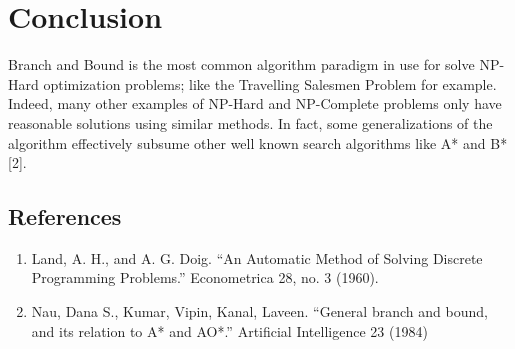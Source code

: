 \documentclass{article}
\newcommand{\be}{\begin{enumerate}}
\newcommand{\ee}{\end{enumerate}}
\begin{document}
\section*{Conclusion}
Branch and Bound is the most common algorithm paradigm in use for solve NP-Hard 
optimization problems; like the Travelling Salesmen Problem for example. Indeed, many 
other examples of NP-Hard and NP-Complete problems only have reasonable solutions using
similar methods. In fact, some generalizations of the algorithm effectively subsume 
other well known search algorithms like A* and B* [2].

\subsection*{References}
\be[1.]
    \item Land, A. H., and A. G. Doig. ``An Automatic Method of Solving Discrete 
    Programming Problems.'' Econometrica 28, no. 3 (1960).
    \item Nau, Dana S., Kumar, Vipin, Kanal, Laveen. ``General branch and bound, and 
    its relation to A* and AO*.'' Artificial Intelligence 23 (1984)
\ee

\noindent\makebox[\linewidth]{\rule{\paperwidth}{0.4pt}}
	
\end{document}
